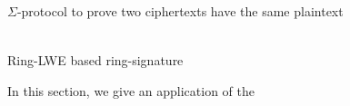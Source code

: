 \begin{section}{$\Sigma$-protocol to prove two ciphertexts have the same plaintext}
\begin{description}
\begin{enumerate}
\begin{align*}
        \end{align*}
      \end{enumerate}
  \end{description}
\end{section}

\begin{section}{Ring-LWE based ring-signature}

  In this section, we give an application of the


\end{section}
